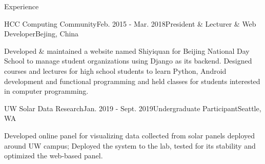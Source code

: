 \documentclass{resume}
\begin{document}
	\begin{rSection}{Experience}



		\begin{rSubsection}{HCC Computing Community}{Feb. 2015 - Mar. 2018}{President \& Lecturer \& Web Developer}{Bejing, China}
			\item Developed \& maintained a website named Shiyiquan for Beijing National Day School to manage student organizations using Django as its backend. Designed courses and lectures for high school students to learn Python, Android development and functional programming and held classes for students interested in computer programming.
		\end{rSubsection}
		\vspace{-5pt}
		\begin{rSubsection}{UW Solar Data Research}{Jan. 2019 - Sept. 2019}{Undergraduate Participant}{Seattle, WA}
			\item Developed online panel for visualizing data collected from solar panels deployed around UW campus; Deployed the system to the lab, tested for its stability and optimized the web-based panel.
		\end{rSubsection}

	\end{rSection}
	\vspace{-5pt}
\end{document}

